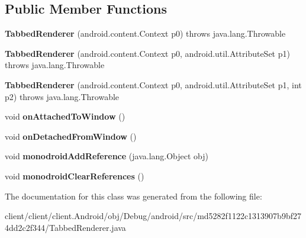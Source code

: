 \subsection*{Public Member Functions}
\begin{DoxyCompactItemize}
\item 
\hypertarget{classmd5282f1122c1313907b9bf274dd2c2f344_1_1TabbedRenderer_a7b78d91f242fa608d3d78a30b5a52218}{}{\bfseries Tabbed\+Renderer} (android.\+content.\+Context p0)  throws java.\+lang.\+Throwable 	\label{classmd5282f1122c1313907b9bf274dd2c2f344_1_1TabbedRenderer_a7b78d91f242fa608d3d78a30b5a52218}

\item 
\hypertarget{classmd5282f1122c1313907b9bf274dd2c2f344_1_1TabbedRenderer_adbd63c2d8e96fd7894c8f4e667f72f34}{}{\bfseries Tabbed\+Renderer} (android.\+content.\+Context p0, android.\+util.\+Attribute\+Set p1)  throws java.\+lang.\+Throwable 	\label{classmd5282f1122c1313907b9bf274dd2c2f344_1_1TabbedRenderer_adbd63c2d8e96fd7894c8f4e667f72f34}

\item 
\hypertarget{classmd5282f1122c1313907b9bf274dd2c2f344_1_1TabbedRenderer_a0bba8ee28391c9de6a0d5cccdedae081}{}{\bfseries Tabbed\+Renderer} (android.\+content.\+Context p0, android.\+util.\+Attribute\+Set p1, int p2)  throws java.\+lang.\+Throwable 	\label{classmd5282f1122c1313907b9bf274dd2c2f344_1_1TabbedRenderer_a0bba8ee28391c9de6a0d5cccdedae081}

\item 
\hypertarget{classmd5282f1122c1313907b9bf274dd2c2f344_1_1TabbedRenderer_a34771b7772c63d1884ce0c48ac54844e}{}void {\bfseries on\+Attached\+To\+Window} ()\label{classmd5282f1122c1313907b9bf274dd2c2f344_1_1TabbedRenderer_a34771b7772c63d1884ce0c48ac54844e}

\item 
\hypertarget{classmd5282f1122c1313907b9bf274dd2c2f344_1_1TabbedRenderer_ab7684c81b99483eb40fbd54bf19bce72}{}void {\bfseries on\+Detached\+From\+Window} ()\label{classmd5282f1122c1313907b9bf274dd2c2f344_1_1TabbedRenderer_ab7684c81b99483eb40fbd54bf19bce72}

\item 
\hypertarget{classmd5282f1122c1313907b9bf274dd2c2f344_1_1TabbedRenderer_ab392857af58d6a5828e333327ea2d25e}{}void {\bfseries monodroid\+Add\+Reference} (java.\+lang.\+Object obj)\label{classmd5282f1122c1313907b9bf274dd2c2f344_1_1TabbedRenderer_ab392857af58d6a5828e333327ea2d25e}

\item 
\hypertarget{classmd5282f1122c1313907b9bf274dd2c2f344_1_1TabbedRenderer_a7a03c362eda31e5a3c544ffc9e300cd9}{}void {\bfseries monodroid\+Clear\+References} ()\label{classmd5282f1122c1313907b9bf274dd2c2f344_1_1TabbedRenderer_a7a03c362eda31e5a3c544ffc9e300cd9}

\end{DoxyCompactItemize}


The documentation for this class was generated from the following file\+:\begin{DoxyCompactItemize}
\item 
client/client/client.\+Android/obj/\+Debug/android/src/md5282f1122c1313907b9bf274dd2c2f344/Tabbed\+Renderer.\+java\end{DoxyCompactItemize}
